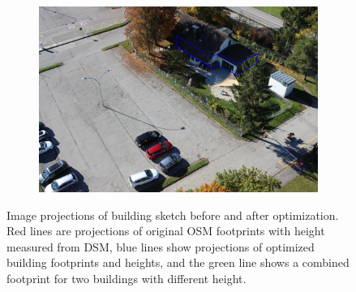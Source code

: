 \begin{figure}[H]
\begin{subfigure}[tbp]{0.31\columnwidth}
           \caption[]{}%
           {{\small }}    
           \label{fig:5k}
       \end{subfigure}
       \begin{subfigure}[tbp]{0.31\columnwidth}  
           \centering 
           \includegraphics[width=\textwidth]{optimize/IMG_1400_xyzh.png}
           \caption[]{}%
           {{\small }}   
           \label{fig:5l}
       \end{subfigure}       
      
       \caption{Image projections of building sketch before and after optimization. Red lines are projections of original OSM footprints with height measured from DSM, blue lines show projections of optimized building footprints and heights, and the green line shows a combined footprint for two buildings with different height.}
       \label{fig:refine}
\end{figure}


